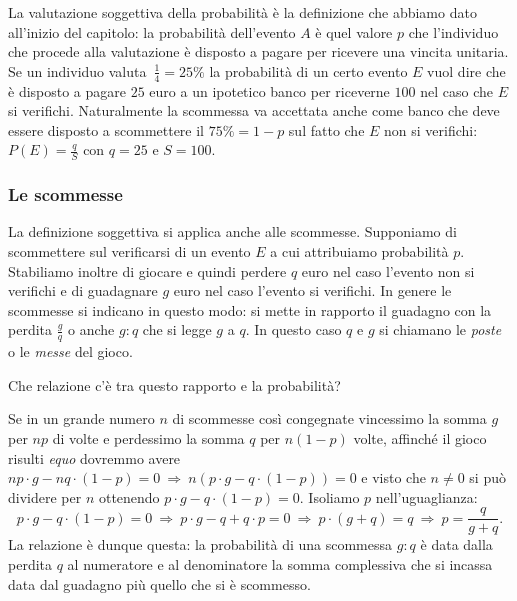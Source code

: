 La valutazione soggettiva della probabilità è la definizione che abbiamo dato all'inizio del capitolo: la probabilità dell'evento $A$ è quel valore $p$ che l'individuo che procede alla valutazione è disposto a pagare per ricevere una vincita unitaria. Se un individuo valuta~$\frac 1 4=25\%$ la probabilità di un certo evento $E$ vuol dire che è disposto a pagare $25$ euro a un ipotetico banco per riceverne $100$ nel caso che $E$ si verifichi. Naturalmente la scommessa va accettata anche come banco che deve essere disposto a scommettere il $75\%=1-p$ sul fatto che $E$ non si verifichi: $P(E)=\frac q S$ con $ q=25 $ e $S=100$.

\subsubsection*{Le scommesse}

La definizione soggettiva si applica anche alle scommesse. Supponiamo di scommettere sul verificarsi di un evento $E$ a cui attribuiamo probabilità $p$. Stabiliamo inoltre di giocare e quindi perdere $q$ euro nel caso l'evento non si verifichi e di guadagnare $g$ euro nel caso l'evento si verifichi. In genere le scommesse si indicano in questo modo: si mette in rapporto il guadagno con la perdita $\frac g q$ o anche $g:q$ che si legge $g$ a $q$. In questo caso $q$ e $g$ si chiamano le \emph{poste} o le \emph{messe} del gioco.


Che relazione c'è tra questo rapporto e la probabilità?

Se in un grande numero $n$ di scommesse così congegnate vincessimo la somma $g$ per $np$ di volte e perdessimo la somma $q$ per $n(1-p)$ volte, affinché il gioco risulti \emph{equo} dovremmo avere $np\cdot g-nq\cdot (1-p)=0 \:\Rightarrow\: n(p\cdot g-q\cdot (1-p))=0$ e visto che $n\neq 0$ si può dividere per $n$ ottenendo $p\cdot g-q\cdot (1-p)=0$. Isoliamo $p$ nell'uguaglianza:
\begin{equation*}
p\cdot g-q\cdot (1-p)=0 \:\Rightarrow\: p\cdot g-q+q\cdot p=0\:\Rightarrow\: p\cdot (g+q)=q \:\Rightarrow\: p=\frac q{g+q}.
\end{equation*}
La relazione è dunque questa: la probabilità di una scommessa $g:q$ è data dalla perdita $q$ al numeratore e al denominatore la somma complessiva che si incassa data dal guadagno più quello che si è scommesso.

